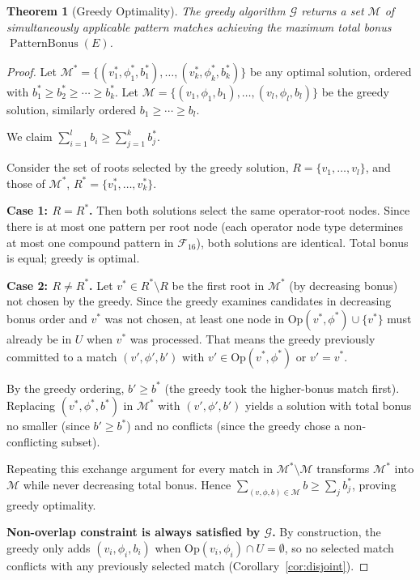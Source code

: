 \documentclass[12pt,a4paper]{article}
\newtheorem{theorem}{Theorem}[section]
\theoremstyle{definition}
\newcommand{\PB}{\operatorname{PatternBonus}}
\begin{document}
\begin{theorem}[Greedy Optimality]
\label{thm:greedy}
The greedy algorithm $\mathcal{G}$ returns a set $\mathcal{M}$ of
simultaneously applicable pattern matches achieving the maximum total
bonus $\PB(E)$.
\end{theorem}

\begin{proof}
Let $\mathcal{M}^* = \{(v_1^*, \phi_1^*, b_1^*), \ldots, (v_k^*, \phi_k^*, b_k^*)\}$
be any optimal solution, ordered with $b_1^* \geq b_2^* \geq \cdots \geq b_k^*$.
Let $\mathcal{M} = \{(v_1, \phi_1, b_1), \ldots, (v_l, \phi_l, b_l)\}$
be the greedy solution, similarly ordered $b_1 \geq \cdots \geq b_l$.

We claim $\sum_{i=1}^l b_i \geq \sum_{j=1}^k b_j^*$.

Consider the set of roots selected by the greedy solution, $R =
\{v_1, \ldots, v_l\}$, and those of $\mathcal{M}^*$, $R^* =
\{v_1^*, \ldots, v_k^*\}$.

\textbf{Case 1: $R = R^*$.}  Then both solutions select the same
operator-root nodes.  Since there is at most one pattern per root
node (each operator node type determines at most one compound pattern
in $\mathcal{F}_{16}$), both solutions are identical.  Total bonus is
equal; greedy is optimal.

\textbf{Case 2: $R \neq R^*$.}  Let $v^* \in R^* \setminus R$ be the
first root in $\mathcal{M}^*$ (by decreasing bonus) not chosen by the
greedy.
Since the greedy examines candidates in decreasing bonus order and
$v^*$ was not chosen, at least one node in
$\mathrm{Op}(v^*, \phi^*) \cup \{v^*\}$ must already be in $U$ when
$v^*$ was processed.  That means the greedy previously committed to a
match $(v', \phi', b')$ with $v' \in \mathrm{Op}(v^*, \phi^*)$ or
$v' = v^*$.

By the greedy ordering, $b' \geq b^*$ (the greedy took the
higher-bonus match first).  Replacing $(v^*, \phi^*, b^*)$ in
$\mathcal{M}^*$ with $(v', \phi', b')$ yields a solution with total
bonus no smaller (since $b' \geq b^*$) and no conflicts (since the
greedy chose a non-conflicting subset).

Repeating this exchange argument for every match in $\mathcal{M}^*
\setminus \mathcal{M}$ transforms $\mathcal{M}^*$ into $\mathcal{M}$
while never decreasing total bonus.  Hence
$\sum_{(v,\phi,b)\in\mathcal{M}} b \geq \sum_{j} b_j^*$, proving greedy
optimality.

\textbf{Non-overlap constraint is always satisfied by $\mathcal{G}$.}
By construction, the greedy only adds $(v_i, \phi_i, b_i)$ when
$\mathrm{Op}(v_i, \phi_i) \cap U = \emptyset$, so no selected match
conflicts with any previously selected match
(Corollary~\ref{cor:disjoint}).
\end{proof}
\end{document}
